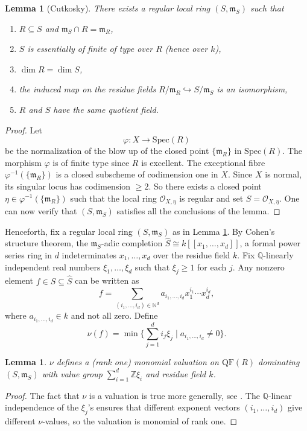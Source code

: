 \documentclass[12pt,a4paper]{amsart}
\theoremstyle{plain}
\newtheorem{lemma}[theorem]{Lemma}
\theoremstyle{definition}
\numberwithin{equation}{theorem}
\newcommand{\mm}{\mathfrak{m}}
\begin{document}
\begin{lemma}[Cutkosky]\label{lem1}
There exists a regular local ring $(S,\mm_S)$ such that
\begin{enumerate}[$(i)$]
 \item $R\subseteq S$ and $\mm_S\cap R = \mm_R$,
 \item $S$ is essentially of finite of type over $R$ (hence over $k$),
 \item $\dim R = \dim S$,
 \item the induced map on the residue fields $R/\mm_R \hookrightarrow S/\mm_S$ is an isomorphism,
 \item $R$ and $S$ have the same quotient field.
\end{enumerate}
\end{lemma}
\begin{proof}
Let $$\varphi\colon X \longrightarrow \mathrm{Spec}(R)$$ be the normalization of the blow up of the closed point $\{\mm_R\}$ in $\mathrm{Spec}(R)$. The morphism $\varphi$ is of finite type since $R$ is excellent. The exceptional fibre $\varphi^{-1}\left(\{\mm_R\}\right)$ is a closed subscheme of codimension one in $X$. Since $X$ is normal, its singular locus has codimension $\geq 2$. So there exists a closed point $\eta \in \varphi^{-1}\left(\{\mm_R\}\right)$ such that the local ring $\mathcal{O}_{X,\eta}$ is regular and set $S=\mathcal{O}_{X,\eta}$. One can now verify that $(S,\mm_S)$ satisfies all the conclusions of the lemma.
\end{proof}

Henceforth, fix a regular local ring $(S,\mm_S)$ as in Lemma \ref{lem1}. By Cohen's structure theorem, the $\mm_S$-adic completion $\widehat{S} \cong k[[x_1,\ldots,x_d]]$, a formal power series ring in $d$ indeterminates $x_1,\ldots,x_d$ over the residue field $k$. Fix $\mathbb{Q}$-linearly independent real numbers $\xi_1,\ldots,\xi_d$ such that $\xi_j\geq 1$ for each $j$. Any nonzero element $f\in S \subseteq \widehat{S}$ can be written as $$f = \sum_{(i_1,\ldots,i_d)\in\mathbb{N}^d}a_{i_1,\ldots,i_d}x_1^{i_1}\cdots x_d^{i_d},$$ where $a_{i_1,\ldots,i_d}\in k$ and not all zero. Define $$\nu(f) = \min\Big\{\sum_{j=1}^d i_j\xi_j \mid a_{i_1,\ldots,i_d}\neq 0\Big\}.$$

\begin{lemma}\label{lem_valuation}
$\nu$ defines a (rank one) monomial valuation on $\mathrm{QF}(R)$ dominating $(S,\mm_S)$ with value group $\sum_{i=1}^d \mathbb{Z}\xi_i$ and residue field $k$.
\end{lemma}
\begin{proof}
The fact that $\nu$ is a valuation is true more generally, see \cite[Chapter VI, Section 15]{ZS60}. The $\mathbb{Q}$-linear independence of the $\xi_j$'s ensures that different exponent vectors $(i_1,\dots,i_d)$ give different $\nu$-values, so the valuation is monomial of rank one.
\end{proof}
\end{document}
